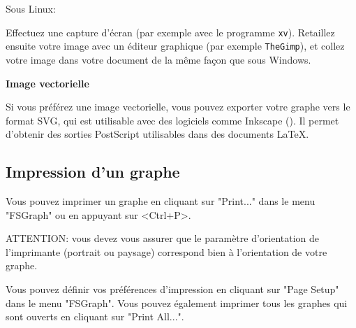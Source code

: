 \bigskip
\noindent Sous Linux:

\bigskip
\noindent Effectuez une capture d’écran (par exemple avec le programme \verb+xv+). Retaillez ensuite
votre image avec un éditeur graphique (par exemple \verb+TheGimp+), et collez votre image dans
votre document de la même façon que sous Windows.

\bigskip
\noindent\textbf{Image vectorielle}

\bigskip
\noindent Si vous préférez une image vectorielle, vous pouvez exporter votre graphe vers le format
SVG, qui est utilisable avec des logiciels comme Inkscape (\cite{Inkscape}).
Il permet d'obtenir des sorties PostScript utilisables dans des documents \LaTeX.

\subsection{Impression d’un graphe}

Vous pouvez imprimer un graphe en cliquant sur "Print..." dans le menu "FSGraph" ou
en appuyant sur <Ctrl+P>.


\bigskip
\noindent ATTENTION: vous devez vous assurer que le paramètre d’orientation de l’imprimante
(portrait ou paysage) correspond bien à l’orientation de votre graphe.


\bigskip
\noindent Vous pouvez définir vos préférences d’impression en cliquant sur "Page Setup" dans le
menu "FSGraph". Vous pouvez également imprimer tous les graphes qui sont ouverts en
cliquant sur "Print All...".



